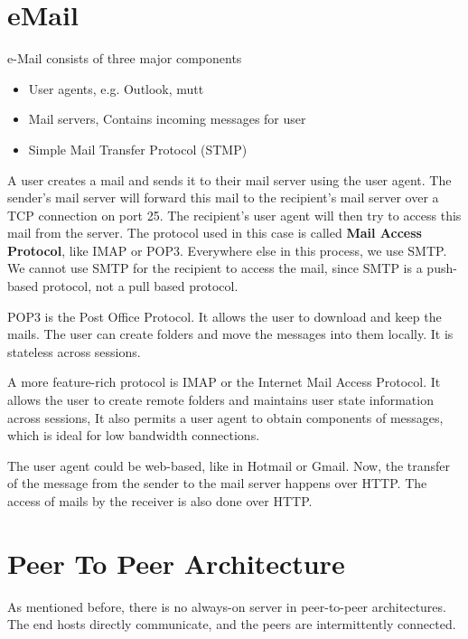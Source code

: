 \documentclass[12pt,letterpaper]{book}
\theoremstyle{definition}
\begin{document}
\section{eMail}

e-Mail consists of three major components

\begin{itemize}
  \item User agents, e.g. Outlook, mutt
  \item Mail servers, Contains incoming messages for user
  \item Simple Mail Transfer Protocol (STMP)
\end{itemize}

A user creates a mail and sends it to their mail server using the user agent. The sender's mail server will forward this mail to the recipient's mail server over a TCP connection on port 25. The recipient's user agent will then try to access this mail from the server. The protocol used in this case is called \textbf{Mail Access Protocol}, like IMAP or POP3. Everywhere else in this process, we use SMTP. We cannot use SMTP for the recipient to access the mail, since SMTP is a push-based protocol, not a pull based protocol.

POP3 is the Post Office Protocol. It allows the user to download and keep the mails. The user can create folders and move the messages into them locally. It is stateless across sessions.

A more feature-rich protocol is IMAP or the Internet Mail Access Protocol. It allows the user to create remote folders and maintains user state information across sessions, It also permits a user agent to obtain components of messages, which is ideal for low bandwidth connections.

The user agent could be web-based, like in Hotmail or Gmail. Now, the transfer of the message from the sender to the mail server happens over HTTP. The access of mails by the receiver is also done over HTTP.

\section{Peer To Peer Architecture}

As mentioned before, there is no always-on server in peer-to-peer architectures. The end hosts directly communicate, and the peers are intermittently connected.
\end{document}
